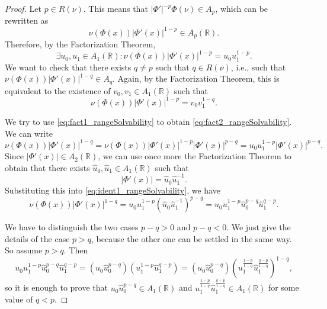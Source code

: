 \documentclass[12pt]{amsart}
\newcommand{\R}{\mathbb{R}}
\theoremstyle{plain}
\theoremstyle{definition}
\numberwithin{equation}{section}
\begin{document}
\begin{proof}
    Let $p\in R(\nu)$. This means that $|\Phi'|^{-p}\Phi(\nu)\in A_p$, which can be rewritten as
    \[
    \nu(\Phi(x))|\Phi'(x)|^{1-p}\in A_p(\R).
    \]
    Therefore, by the Factorization Theorem,  
    \begin{equation}\label{eq:fact1_rangeSolvability}
    \exists u_0,u_1\in A_1(\R): \nu(\Phi(x))|\Phi'(x)|^{1-p}=u_0 u_1^{1-p}.    
    \end{equation}
    We want to check that there exists $q\neq p$ such that $q\in R(\nu)$, i.e., such that $\nu(\Phi(x))|\Phi'(x)|^{1-q}\in A_q$. Again, by the Factorization Theorem, this is equivalent to the existence of $v_0,v_1\in A_1(\R)$ such that
    \begin{equation}\label{eq:fact2_rangeSolvability}
        \nu(\Phi(x))|\Phi'(x)|^{1-p}=v_0 v_1^{1-q}.
    \end{equation}


    We try to use \eqref{eq:fact1_rangeSolvability} to obtain \eqref{eq:fact2_rangeSolvability}. We can write
    \begin{equation}\label{eq:ident1_rangeSolvability}
    \nu(\Phi(x))|\Phi'(x)|^{1-q}
    =
    \nu(\Phi(x))|\Phi'(x)|^{1-p}|\Phi'(x)|^{p-q}
    =
    u_0 u_1^{1-p}|\Phi'(x)|^{p-q}.    
    \end{equation}
    Since $|\Phi'(x)|\in A_2(\R)$, we can use once more the Factorization Theorem to obtain that there exists $\widehat{u}_0,\widehat{u}_1\in A_1(\R)$ such that
    \[
    |\Phi'(x)|
    =
    \widehat{u}_0\widehat{u}_1^{-1}.
    \]
    Substituting this into \eqref{eq:ident1_rangeSolvability}, we have
    \begin{equation}\label{eq:ident2_rangeSolvability}
    \nu(\Phi(x))|\Phi'(x)|^{1-q}
    =
    u_0 u_1^{1-p}(\widehat{u}_0\widehat{u}_1^{-1})^{p-q}
    =
    u_0 u_{1}^{1-p} \widehat{u}_{0}^{p-q} \widehat{u}_{1}^{q-p}.    
    \end{equation}

We have to distinguish the two cases $p-q>0$ and $p-q<0$. We just give the details of the case $p>q$, because the other one can be settled in the same way. So assume $p>q$. Then
    \begin{equation}\label{eq:case1_rangeSolvability}
        u_0 u_1^{1-p} \widehat{u}_{0}^{p-q}\widehat{u}_{1}^{q-p}
        =
        (u_0\widehat{u}_0^{p-q})(u_1^{1-p}\widehat{u}_1^{q-p})
        =
        (u_0\widehat{u}_0^{p-q})(u_1^{\frac{1-p}{1-q}}\widehat{u}_{1}^{\frac{q-p}{1-q}})^{1-q},
    \end{equation}
    so it is enough to prove that $u_0\widehat{u}_0^{p-q}\in A_1(\R)$ and $u_1^{\frac{1-p}{1-q}}\widehat{u}_{1}^{\frac{q-p}{1-q}}\in A_1(\R)$ for some value of $q<p$.


\end{proof}
\end{document}
